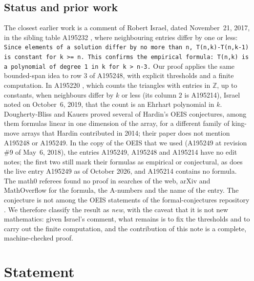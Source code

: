 \documentclass[11pt]{amsart}
\theoremstyle{plain}
\theoremstyle{definition}
\newcommand{\Z}{\mathbb{Z}}
\begin{document}
\subsection*{Status and prior work}
The closest earlier work is a comment of Robert Israel, dated November~21, 2017, in the sibling table A195232 \cite{A195232}, where neighbouring entries differ by one or less: \texttt{Since elements of a solution differ by no more than n, T(n,k)-T(n,k-1) is constant for k >= n. This confirms the empirical formula: T(n,k) is a polynomial of degree 1 in k for k > n-3.}
Our proof applies the same bounded-span idea to row $3$ of A195248, with explicit thresholds and a finite computation.
In A195220 \cite{A195220}, which counts the triangles with entries in $\Z$, up to constants, when neighbours differ by $k$ or less (its column $2$ is A195214), Israel noted on October~6, 2019, that the count is an Ehrhart polynomial in $k$.
Dougherty-Bliss and Kauers \cite{DBK} proved several of Hardin's OEIS conjectures, among them formulas linear in one dimension of the array, for a different family of king-move arrays that Hardin contributed in 2014; their paper does not mention A195248 or A195249.
In the copy of the OEIS that we used (A195249 at revision \#9 of May~6, 2018), the entries A195249, A195248 and A195214 have no edit notes; the first two still mark their formulas as empirical or conjectural, as does the live entry A195249 as of October 2026, and A195214 contains no formula. The math0 referees found no proof in searches of the web, arXiv and MathOverflow for the formula, the A-numbers and the name of the entry.
The conjecture is not among the OEIS statements of the formal-conjectures repository \cite{FC}.
We therefore classify the result as \emph{new}, with the caveat that it is not new mathematics: given Israel's comment, what remains is to fix the thresholds and to carry out the finite computation, and the contribution of this note is a complete, machine-checked proof.

\section{Statement}\label{sec:statement}
\end{document}
